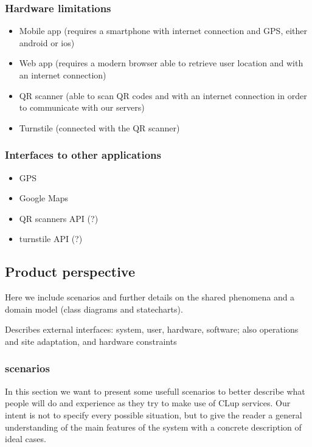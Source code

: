 \subsubsection{Hardware limitations}
\label{subsubsect:hardwarelimitations}

\begin{itemize}
    \item Mobile app (requires a smartphone with internet connection and GPS, either android or ios)
    \item Web app (requires a modern browser able to retrieve user location and with an internet connection)
    \item QR scanner (able to scan QR codes and with an internet connection in order to communicate with our servers)
    \item Turnstile (connected with the QR scanner)
\end{itemize}


\subsubsection{Interfaces to other applications}
\label{subsubsect:interfacestootherappications}

\begin{itemize}
    \item GPS
    \item Google Maps
    \item QR scanners API (?)
    \item turnstile API (?)
\end{itemize}

\subsection{Product perspective}
\label{subsect:productperspective}

Here we include scenarios and further details on the shared phenomena and a domain model (class diagrams and statecharts).

Describes external interfaces: system, user, hardware, software; also operations and site adaptation, and hardware constraints

\subsubsection{scenarios}
\label{subsubsect:scenarios}

In this section we want to present some usefull scenarios to better describe what people will do and experience as they try to make use of CLup services. Our intent is not to specify every possible situation, but to give the reader a general understanding of the main features of the system with a concrete description of ideal cases.
 
